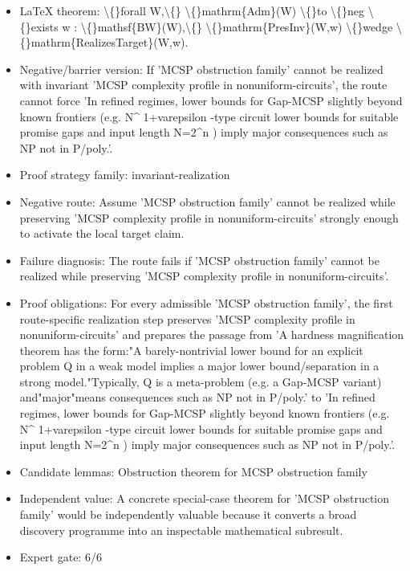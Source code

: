 \documentclass[11pt]{article}
\begin{document}
\begin{itemize}
\item LaTeX theorem: \textbackslash\{\}forall W,\textbackslash\{\} \textbackslash\{\}mathrm\{Adm\}(W) \textbackslash\{\}to \textbackslash\{\}neg \textbackslash\{\}exists w : \textbackslash\{\}mathsf\{BW\}(W),\textbackslash\{\} \textbackslash\{\}mathrm\{PresInv\}(W,w) \textbackslash\{\}wedge \textbackslash\{\}mathrm\{RealizesTarget\}(W,w).
\item Negative/barrier version: If 'MCSP obstruction family' cannot be realized with invariant 'MCSP complexity profile in nonuniform-circuits', the route cannot force 'In refined regimes, lower bounds for Gap-MCSP slightly beyond known frontiers (e.g. N\textasciicircum{} 1+varepsilon -type circuit lower bounds for suitable promise gaps and input length N=2\textasciicircum{}n ) imply major consequences such as NP not in P/poly.'.
\item Proof strategy family: invariant-realization
\item Negative route: Assume 'MCSP obstruction family' cannot be realized while preserving 'MCSP complexity profile in nonuniform-circuits' strongly enough to activate the local target claim.
\item Failure diagnosis: The route fails if 'MCSP obstruction family' cannot be realized while preserving 'MCSP complexity profile in nonuniform-circuits'.
\item Proof obligations: For every admissible 'MCSP obstruction family', the first route-specific realization step preserves 'MCSP complexity profile in nonuniform-circuits' and prepares the passage from 'A hardness magnification theorem has the form:"A barely-nontrivial lower bound for an explicit problem Q in a weak model implies a major lower bound/separation in a strong model."Typically, Q is a meta-problem (e.g. a Gap-MCSP variant) and"major"means consequences such as NP not in P/poly.' to 'In refined regimes, lower bounds for Gap-MCSP slightly beyond known frontiers (e.g. N\textasciicircum{} 1+varepsilon -type circuit lower bounds for suitable promise gaps and input length N=2\textasciicircum{}n ) imply major consequences such as NP not in P/poly.'.
\item Candidate lemmas: Obstruction theorem for MCSP obstruction family
\item Independent value: A concrete special-case theorem for 'MCSP obstruction family' would be independently valuable because it converts a broad discovery programme into an inspectable mathematical subresult.
\item Expert gate: 6/6
\end{itemize}
\end{document}

